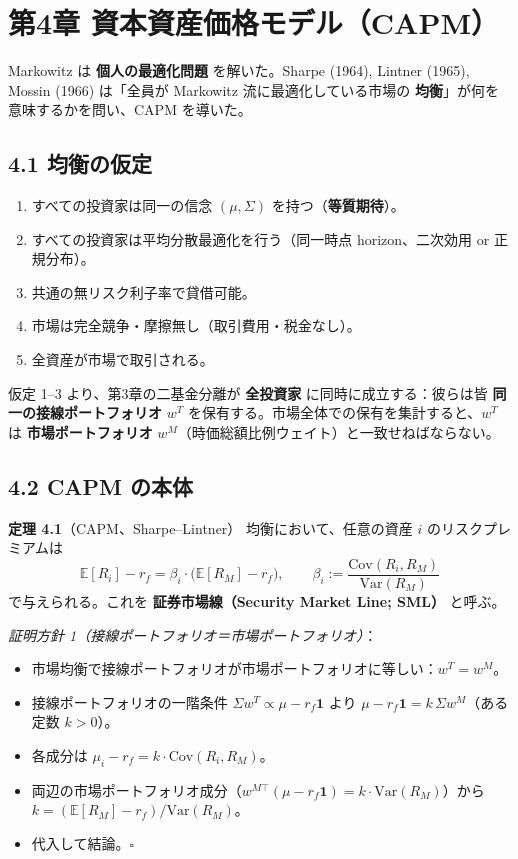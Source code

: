 \documentclass[11pt,a4paper]{report}
\begin{document}
\noindent\hrulefill

\chapter{第4章 資本資産価格モデル（CAPM）}

Markowitz は \textbf{個人の最適化問題} を解いた。Sharpe (1964), Lintner (1965), Mossin (1966) は「全員が Markowitz 流に最適化している市場の \textbf{均衡}」が何を意味するかを問い、CAPM を導いた。

\section{4.1 均衡の仮定}

\begin{enumerate}
\item すべての投資家は同一の信念 $(\mu, \Sigma)$ を持つ（\textbf{等質期待}）。
\item すべての投資家は平均分散最適化を行う（同一時点 horizon、二次効用 or 正規分布）。
\item 共通の無リスク利子率で貸借可能。
\item 市場は完全競争・摩擦無し（取引費用・税金なし）。
\item 全資産が市場で取引される。
\end{enumerate}

仮定 1–3 より、第3章の二基金分離が \textbf{全投資家} に同時に成立する：彼らは皆 \textbf{同一の接線ポートフォリオ} $w^T$ を保有する。市場全体での保有を集計すると、$w^T$ は \textbf{市場ポートフォリオ} $w^M$（時価総額比例ウェイト）と一致せねばならない。

\section{4.2 CAPM の本体}

\textbf{定理 4.1}（CAPM、Sharpe–Lintner） 均衡において、任意の資産 $i$ のリスクプレミアムは \[ \boxed{\; \mathbb{E}[R_i] - r_f = \beta_i \cdot \big(\mathbb{E}[R_M] - r_f\big),\qquad \beta_i := \frac{\mathrm{Cov}(R_i, R_M)}{\mathrm{Var}(R_M)} \;} \] で与えられる。これを \textbf{証券市場線（Security Market Line; SML）} と呼ぶ。

\emph{証明方針 1（接線ポートフォリオ＝市場ポートフォリオ）}：
\begin{itemize}
\item 市場均衡で接線ポートフォリオが市場ポートフォリオに等しい：$w^T = w^M$。
\item 接線ポートフォリオの一階条件 $\Sigma w^T \propto \mu - r_f\mathbf{1}$ より $\mu - r_f \mathbf{1} = k\, \Sigma w^M$（ある定数 $k>0$）。
\item 各成分は $\mu_i - r_f = k \cdot \mathrm{Cov}(R_i, R_M)$。
\item 両辺の市場ポートフォリオ成分（$w^{M\top}(\mu - r_f\mathbf{1}) = k \cdot \mathrm{Var}(R_M)$）から $k = (\mathbb{E}[R_M] - r_f)/\mathrm{Var}(R_M)$。
\item 代入して結論。$\square$
\end{itemize}
\end{document}

